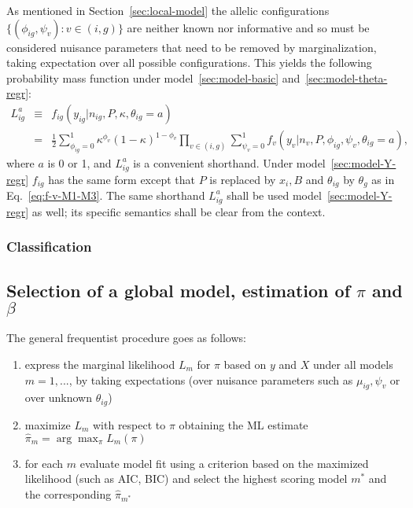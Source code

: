 \documentclass[letterpaper]{article}
\begin{document}
As mentioned in Section~\ref{sec:local-model} the allelic configurations
\( \{ (\phi_{ig},\psi_v) : v\in(i,g) \} \) are
neither known nor informative and so must be considered nuisance parameters that
need to be removed by marginalization, taking expectation over all
possible configurations.  This yields the following probability mass
function under model~\ref{sec:model-basic} and~\ref{sec:model-theta-regr}:
\begin{eqnarray}
\label{eq:f-ig}
L_{ig}^a &\equiv&
f_{ig}(y_{ig} | n_{ig}, P, \kappa, \theta_{ig}=a)
\\
&=&
\frac{1}{2}
\sum_{\phi_{ig}=0}^1 \kappa^{\phi_v} (1 - \kappa)^{1-\phi_v}
\prod_{v\in(i,g)}
\sum_{\psi_v=0}^1
f_v(y_v | n_v, P, \phi_{ig}, \psi_v, \theta_{ig}=a),
\end{eqnarray}
where \(a\) is 0 or 1, and \(L_{ig}^a\) is a convenient shorthand.  Under
model~\ref{sec:model-Y-regr} \(f_{ig}\) has the same form except that \(P\) is
replaced by \(x_i,B\) and \(\theta_{ig}\) by \(\theta_g\) as in
Eq.~\ref{eq:f-v-M1-M3}.  The same shorthand \(L_{ig}^a\) shall
be used model~\ref{sec:model-Y-regr} as well; its specific semantics shall be clear from
the context.

\subsubsection{Classification}

\subsection{Selection of a global model, estimation of \(\pi\) and \(\beta\)}
\label{sec:marginal-likelihood-pi}

The general frequentist procedure goes as follows:
\begin{enumerate}
\item
express the marginal likelihood \(L_m\) for \(\pi\) based on \(y\)
and \(X\) under all models \(m=1,...\), by taking expectations (over nuisance
parameters such as \(\mu_{ig},\psi_v\) or over unknown \(\theta_{ig}\))
\item 
maximize \(L_m\) with respect to \(\pi\) obtaining the ML estimate
\(\hat{\pi}_m=\arg\max_\pi L_{m}(\pi)\)
\item for each \(m\) evaluate model fit using a criterion based on the
maximized likelihood (such as AIC, BIC) and select the highest scoring model
\(m^*\) and the corresponding \(\hat{\pi}_{m^*}\)
\end{enumerate}
\end{document}
